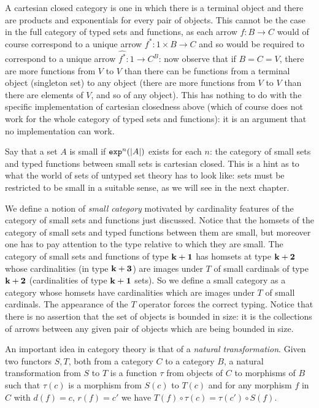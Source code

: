 \documentclass[12pt]{book}
\begin{document}
A cartesian closed category is one in which there is a terminal object and there are products and exponentials for every pair of objects.  This cannot be the case in the full category of typed sets and functions, as each arrow $f:B \rightarrow C$ would of course correspond to a unique  arrow $f^*:1 \times B \rightarrow C$ and so would be required to correspond to a unique arrow $\hat{f^*}:1 \rightarrow C^B$:  now observe that if $B=C=V$, there are more functions from $V$ to $V$
than there can be functions from a terminal object (singleton set) to any object (there are more functions from $V$ to $V$ than there are elements of $V$, and so of any object).  This has nothing to do with the specific implementation of cartesian closedness above (which of course does not work for the whole category of typed sets and functions):  it is an argument that no implementation can work.

Say that a set $A$ is small if ${\tt exp}^n(|A|)$ exists for each $n$:  the category of small sets and typed functions between small sets is cartesian closed.  This is a hint as to what the world of sets of untyped set theory has to look like:  sets must be restricted to be small in a suitable sense, as we will see in the next chapter.

We define a notion of {\em small category\/} motivated by cardinality features of the category of small sets and functions just discussed.  Notice
that the homsets of the category of small sets and typed functions between them are small, but moreover one has to pay attention to the type relative to which they are small.  The category of small sets and functions of type ${\bf k+1}$ has homsets at type ${\bf k+2}$ whose cardinalities (in type ${\bf k+3}$) are images under $T$ of
small cardinals of type ${\bf k+2}$ (cardinalities of type ${\bf k+1}$ sets).  So we define a small category as a category whose homsets have cardinalities which are images under $T$ of small cardinals.  The appearance of the $T$ operator forces the correct typing.  Notice that there is no assertion that the set of objects is bounded in size:  it is the collections of arrows between any given pair of objects which are being bounded in size.

An important idea in category theory is that of a {\em natural transformation\/}.   Given two functors $S,T$, both from a category $C$ to a category $B$, a natural transformation from $S$ to $T$ is a function $\tau$ from objects of $C$ to morphisms of $B$ such that $\tau(c)$ is a morphism from
$S(c)$ to $T(c)$ and for any morphism $f$ in $C$ with $d(f)=c$, $r(f)=c'$ we have $T(f) \circ \tau(c) = \tau(c') \circ S(f)$.
\end{document}
